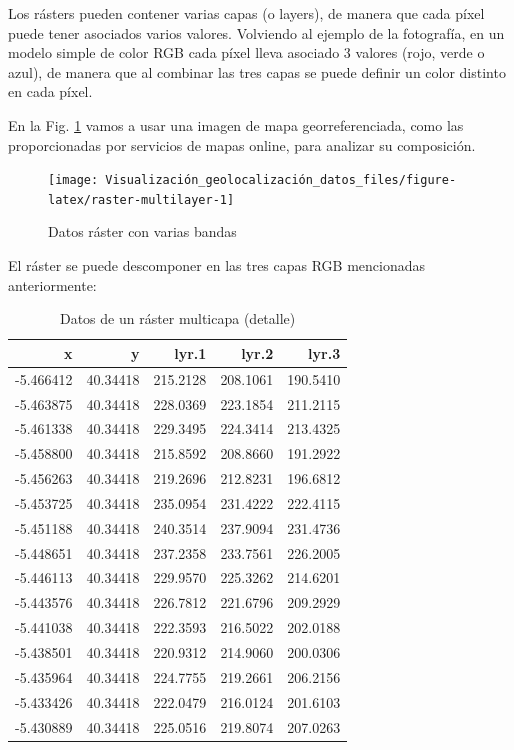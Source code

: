 \documentclass[
]{report}
\theoremstyle{definition}
\theoremstyle{definition}
\theoremstyle{definition}
\theoremstyle{definition}
\theoremstyle{remark}
\begin{document}
Los rásters pueden contener varias capas (o layers), de manera que cada píxel
puede tener asociados varios valores. Volviendo al ejemplo de la fotografía, en
un modelo simple de color RGB cada píxel lleva asociado 3 valores (rojo, verde o
azul), de manera que al combinar las tres capas se puede definir un color
distinto en cada píxel.

En la Fig. \ref{fig:raster-multilayer} vamos a usar una imagen de mapa
georreferenciada, como las proporcionadas por servicios de mapas online, para
analizar su composición.

\begin{figure}

{\centering \texttt{[image: Visualización\_geolocalización\_datos\_files/figure-latex/raster-multilayer-1]} 

}

\caption{Datos ráster con varias bandas}\label{fig:raster-multilayer}
\end{figure}

El ráster se puede descomponer en las tres capas RGB mencionadas anteriormente:

\begin{table}

\caption{\label{tab:detalle-pixel-multicapa}Datos de un ráster multicapa (detalle)}
\centering
\begin{tabular}[t]{r|r|r|r|r}
\hline
x & y & lyr.1 & lyr.2 & lyr.3\\
\hline
-5.466412 & 40.34418 & 215.2128 & 208.1061 & 190.5410\\
\hline
-5.463875 & 40.34418 & 228.0369 & 223.1854 & 211.2115\\
\hline
-5.461338 & 40.34418 & 229.3495 & 224.3414 & 213.4325\\
\hline
-5.458800 & 40.34418 & 215.8592 & 208.8660 & 191.2922\\
\hline
-5.456263 & 40.34418 & 219.2696 & 212.8231 & 196.6812\\
\hline
-5.453725 & 40.34418 & 235.0954 & 231.4222 & 222.4115\\
\hline
-5.451188 & 40.34418 & 240.3514 & 237.9094 & 231.4736\\
\hline
-5.448651 & 40.34418 & 237.2358 & 233.7561 & 226.2005\\
\hline
-5.446113 & 40.34418 & 229.9570 & 225.3262 & 214.6201\\
\hline
-5.443576 & 40.34418 & 226.7812 & 221.6796 & 209.2929\\
\hline
-5.441038 & 40.34418 & 222.3593 & 216.5022 & 202.0188\\
\hline
-5.438501 & 40.34418 & 220.9312 & 214.9060 & 200.0306\\
\hline
-5.435964 & 40.34418 & 224.7755 & 219.2661 & 206.2156\\
\hline
-5.433426 & 40.34418 & 222.0479 & 216.0124 & 201.6103\\
\hline
-5.430889 & 40.34418 & 225.0516 & 219.8074 & 207.0263\\
\hline
\end{tabular}
\end{table}
\end{document}
